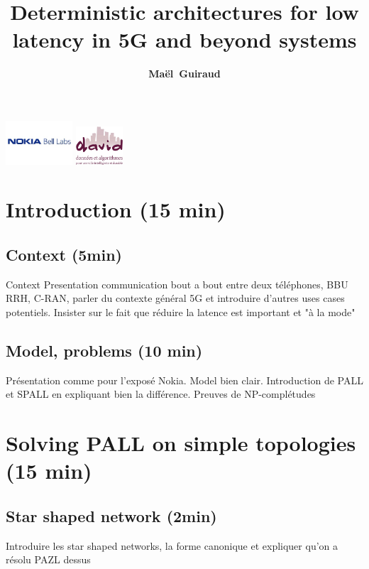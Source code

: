 \documentclass[10 pt]{beamer}
\title{ Deterministic architectures for low latency in 5G and beyond systems}
\author{{\bf Maël~Guiraud}}
\institute[Nokia Bell Labs, DAVID-UVSQ] 
{
  Nokia Bell Labs France - DAVID, Universit\'e de Versailles Saint Quentin
   \\
}
\begin{document}
\begin{frame}

  \titlepage
  \centering
  \includegraphics [width=25mm]{logon.png} \hspace{1cm} \includegraphics [width=17.5mm]{logod.png} \\
\end{frame}


\begin{frame}

\tableofcontents 
\end{frame}



\section{Introduction (15 min)}
\subsection{Context (5min)}
\begin{frame}{Context}
Presentation communication bout a bout entre deux téléphones, BBU RRH, C-RAN, parler du contexte général 5G et introduire d'autres uses cases potentiels. Insister sur le fait que réduire la latence est important et "à la mode"
\end{frame}
\subsection{Model, problems (10 min)}
\begin{frame}
Présentation comme pour l'exposé Nokia. Model bien clair. Introduction de PALL et SPALL en expliquant bien la différence. Preuves de NP-complétudes
\end{frame}
\section{Solving PALL on simple topologies (15 min)}
\subsection{Star shaped network (2min)}
\begin{frame}
Introduire les star shaped networks, la forme canonique et expliquer qu'on a résolu PAZL dessus
\end{frame}
\end{document}
